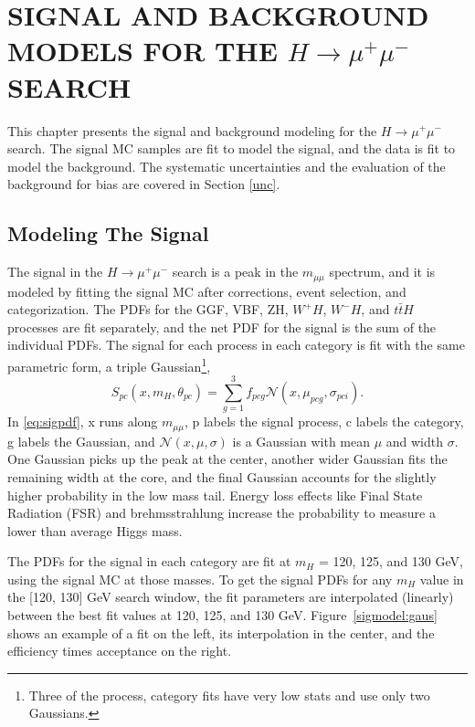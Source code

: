 \chapter{SIGNAL AND BACKGROUND MODELS FOR THE $H\rightarrow\mu^+\mu^-$ SEARCH} \label{modeling}

This chapter presents the signal and background modeling for the $H\rightarrow\mu^+\mu^-$ search. The signal MC samples are fit to model the signal, and the data is fit to model the background. The systematic uncertainties and the evaluation of the background for bias are covered in Section \ref{unc}.

\section{Modeling The Signal}
The signal in the $H\rightarrow\mu^+\mu^-$ search is a peak in the $m_{\mu\mu}$ spectrum, and it is modeled by fitting the signal MC after corrections, event selection, and categorization. The PDFs for the GGF, VBF, ZH, $W^+H$, $W^-H$, and $t\bar{t}H$ processes are fit separately, and the net PDF for the signal is the sum of the individual PDFs. The signal for each process in each category is fit with the same parametric form, a triple Gaussian\footnote{Three of the process, category fits have very low stats and use only two Gaussians.}, 
\begin{equation}
\label{eq:sigpdf}
S_{pc}(x, m_H, \theta_{pc}) = \sum_{g=1}^{3}f_{pcg}\mathcal{N}(x, \mu_{pcg}, \sigma_{pci}).
\end{equation}
In \ref{eq:sigpdf}, x runs along $m_{\mu\mu}$, p labels the signal process, c labels the category, g labels the Gaussian, and $\mathcal{N}(x, \mu, \sigma)$ is a Gaussian with mean $\mu$ and width $\sigma$. One Gaussian picks up the peak at the center, another wider Gaussian fits the remaining width at the core, and the final Gaussian accounts for the slightly higher probability in the low mass tail. Energy loss effects like Final State Radiation (FSR) and brehmsstrahlung increase the probability to measure a lower than average Higgs mass. 

The PDFs for the signal in each category are fit at $m_H$ = 120, 125, and 130 GeV, using the signal MC at those masses. To get the signal PDFs for any $m_H$ value in the [120, 130] GeV search window, the fit parameters are interpolated (linearly) between the best fit values at 120, 125, and 130 GeV. Figure~\ref{sigmodel:gaus} shows an example of a fit on the left, its interpolation in the center, and the efficiency times acceptance on the right.


